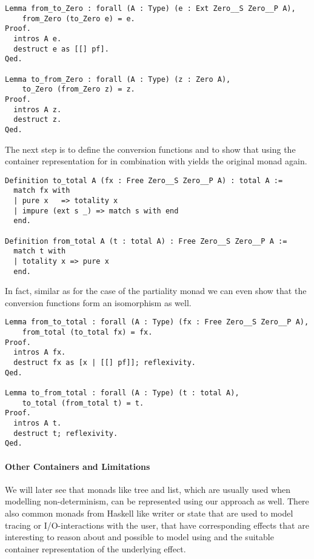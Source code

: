 \begin{verbatim}
Lemma from_to_Zero : forall (A : Type) (e : Ext Zero__S Zero__P A),
    from_Zero (to_Zero e) = e.
Proof.
  intros A e.
  destruct e as [[] pf].
Qed.

Lemma to_from_Zero : forall (A : Type) (z : Zero A),
    to_Zero (from_Zero z) = z.
Proof.
  intros A z.
  destruct z.
Qed.
\end{verbatim}

The next step is to define the conversion functions 
and  to show that using
the container representation for  in combination with
 yields the original monad  again.

\begin{verbatim}
Definition to_total A (fx : Free Zero__S Zero__P A) : total A :=
  match fx with
  | pure x   => totality x
  | impure (ext s _) => match s with end
  end.

Definition from_total A (t : total A) : Free Zero__S Zero__P A :=
  match t with
  | totality x => pure x
  end.
\end{verbatim}

\noindent
In fact, similar as for the case of the partiality monad we can even
show that the conversion functions form an isomorphism as well.

\begin{verbatim}
Lemma from_to_total : forall (A : Type) (fx : Free Zero__S Zero__P A),
    from_total (to_total fx) = fx.
Proof.
  intros A fx.
  destruct fx as [x | [[] pf]]; reflexivity.
Qed.

Lemma to_from_total : forall (A : Type) (t : total A),
    to_total (from_total t) = t.
Proof.
  intros A t.
  destruct t; reflexivity.
Qed.
\end{verbatim}

\paragraph{Other Containers and Limitations}

We will later see that monads like tree and list, which are usually
used when modelling non-determinism, can be represented using our
approach as well.
There also common monads from Haskell like writer or state that are
used to model tracing or I/O-interactions with the user, that have
corresponding effects that are interesting to reason about and
possible to model using  and the suitable container
representation of the underlying effect.

